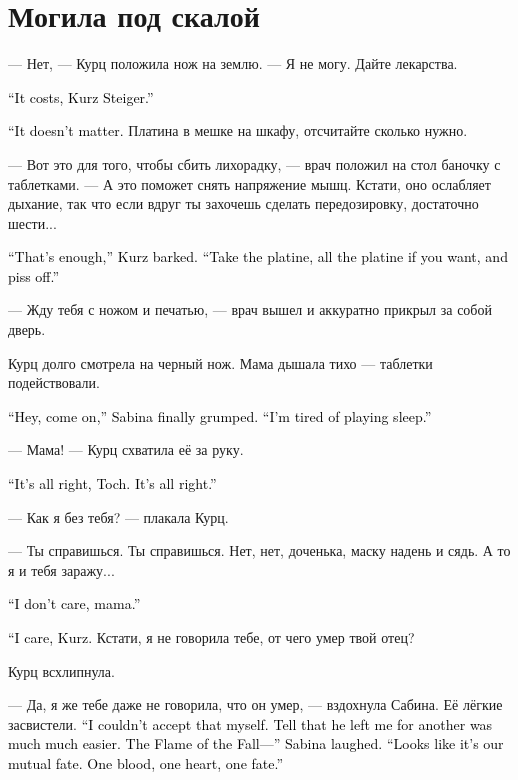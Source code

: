 \documentclass[a4paper,12pt,fleqn]{book}\usepackage{cooltooltips}\usepackage{polyglossia}\setdefaultlanguage[babelshorthands=true]{russian}\setotherlanguage{english}\defaultfontfeatures{Ligatures=TeX,Mapping=tex-text} \usepackage{xcolor}\definecolor{lightgray}{HTML}{bbbbbb}\color{lightgray}\newcommand{\ml}[3]{\textenglish{\textcolor{black}{#3}}}
\begin{document}
\section{Могила под скалой}

--- Нет, --- Курц положила нож на землю.
--- Я не могу.
Дайте лекарства.

\ml{$0$}
{--- Это не бесплатно, Курц Штайгер.}
{``It costs, Kurz Steiger.''}

\ml{$0$}
{--- Мне всё равно.}
{``It doesn't matter.}
Платина в мешке на шкафу, отсчитайте сколько нужно.

--- Вот это для того, чтобы сбить лихорадку, --- врач положил на стол баночку с таблетками.
--- А это поможет снять напряжение мышц.
Кстати, оно ослабляет дыхание, так что если вдруг ты захочешь сделать передозировку, достаточно шести...

\ml{$0$}
{--- Хватит, --- рявкнула Курц.}
{``That's enough,'' Kurz barked.}
\ml{$0$}
{--- Забирай платину, хоть всю, только проваливай.}
{``Take the platine, all the platine if you want, and piss off.''}

--- Жду тебя с ножом и печатью, --- врач вышел и аккуратно прикрыл за собой дверь.

Курц долго смотрела на черный нож.
Мама дышала тихо --- таблетки подействовали.

\ml{$0$}
{--- Давай уже, --- наконец проворчала Сабина.}
{``Hey, come on,'' Sabina finally grumped.}
\ml{$0$}
{--- Надоело притворяться спящей.}
{``I'm tired of playing sleep.''}

--- Мама! --- Курц схватила её за руку.

\ml{$0$}
{--- Всё хорошо, дочка.}
{``It's all right, Toch.}
\ml{$0$}
{Всё хорошо.}
{It's all right.''}

--- Как я без тебя? --- плакала Курц.

--- Ты справишься.
Ты справишься.
Нет, нет, доченька, маску надень и сядь.
А то я и тебя заражу...

\ml{$0$}
{--- Мне всё равно, мама.}
{``I don't care, mama.''}

\ml{$0$}
{--- Мне не всё равно, Курц.}
{``I care, Kurz.}
Кстати, я не говорила тебе, от чего умер твой отец?

Курц всхлипнула.

--- Да, я же тебе даже не говорила, что он умер, --- вздохнула Сабина.
Её лёгкие засвистели.
\ml{$0$}
{--- Я сама не могла с этим смириться.}
{``I couldn't accept that myself.}
\ml{$0$}
{Проще было сказать, что он ушёл к другой.}
{Tell that he left me for another was much much easier.}
\ml{$0$}
{Пламя Осени... --- Сабина усмехнулась.}
{The Flame of the Fall---'' Sabina laughed.}
\ml{$0$}
{--- Видать, судьба у нас с ним такая.}
{``Looks like it's our mutual fate.}
\ml{$0$}
{Одна кровь, одно сердце, одна судьба.}
{One blood, one heart, one fate.''}
\end{document}
